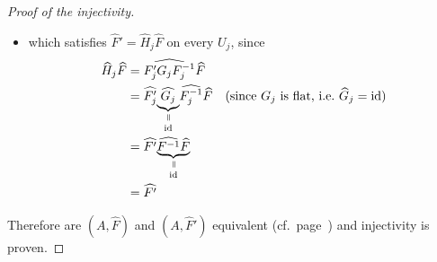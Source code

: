 \begin{proof}[Proof of the injectivity]
\begin{itemize}
    \item which satisfies $\hat F'=\hat H_j\hat F$ on every $U_j$, since
      \begin{align*}
        \hat H_j\hat F&= \widehat{F_j'G_{j}F_j^{-1}} \hat F
        \\&= \hat{F_j'}
        \underset{\id}{%
          \underset{\text{\rotatebox[origin=c]{-90}{$=$}}}{%
            \underbrace{%
              \hat{G_{j}}
            }
          }
        }
        \hat{F_j^{-1}} \hat F
        & \text{(since $G_j$ is flat, i.e.\ $\hat G_j=\id$)}
        \\&= \hat{F'}
        \underset{\id}{%
          \underset{\text{\rotatebox[origin=c]{-90}{$=$}}}{%
            \underbrace{%
              \hat{F^{-1}} \hat F
            }
          }
        }
        \\&= \hat{F'}
      \end{align*}
  \end{itemize}
  Therefore are $(A,\hat F)$ and $(A,\hat F')$ equivalent
  (cf.\ page~\pageref{page:ofDefnOfIsomOfMarkedPairs}) and injectivity is
  proven.
  \iffalse
    \begin{comment}
      \textbf{First look at injectivity:}
      Consider the two elements $(\cM,\nabla,\hat f)$ and $(\cM',\nabla',\hat
      f')$ of $\cH$ which map to same cohomology class
      \[
        \exp((\cM,\nabla,\hat f))=\lambda=\exp((\cM',\nabla',\hat f'))
          \in H^1(S^1;\Lambda(A^0)) \,.
      \]
      Since we can use refined coverings, it is possible to find a finite
      covering $\cU=\{U_j;j\in J\}$ of $S^1$ such that $\lambda$ is the class
      of the cocycles $(f_lf_j^{-1})$ and $(f_l',f_j'^{-1})$, where
      $f_j$,$f_j'$ are defined on $U_j$.
      Since $[(f_lf_j^{-1})]=[(f_l'f_j'^{-1})]$ there exists a $0$-cochain
      $(g_j)$ of the sheaf $\Aut^{<0}(\tilde\cM^{nf})$ relative to the covering
      $(I_j)$, such that
      \[
        f_l'f_j'^{-1}=g_lf_lf_j^{-1}g_j^{-1} \text{ on } I_j\cap I_l.
      \]
      If we set $\sigma=f_j^{-1}g_{j}^{-1}f_j'$ on $I_{j}$, we get a horizontal
      section\TODO[~on~???], thus\TODO[why?] it satisfies
      $\sigma\circ\hat{f'}=\hat f$. Therefore are $(\cM,\nabla,\hat f)$ and
      $(\cM',\nabla',\hat{f'})$ isomorphic and injectivity is proven.
    \end{comment}
  \fi
\end{proof}

